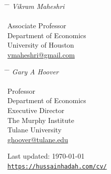 \documentclass[letterpaper]{article}
\begin{document}
\vspace{0.7cm}

\noindent
\parbox[t]{0.32\textwidth}{
\begin{tabbing}
\hspace{2.75cm} \= \hspace{4cm} \= \kill
{\textit{Vikram Maheshri} } \\\\
Associate Professor \\
Department of Economics \\
{University of Houston}\\
{\href{mailto:vmaheshri@gmail.com}{vmaheshri@gmail.com}}
\end{tabbing}}
\hfill
\parbox[t]{0.32\textwidth}{
\begin{tabbing}
\hspace{2.75cm} \= \hspace{4cm} \= \kill
{\textit{Gary A Hoover} } \\\\
Professor  \\
Department of Economics \\
Executive Director \\
The Murphy Institute \\
{Tulane University}\\
{\href{mailto:ghoover@tulane.edu}{ghoover@tulane.edu}}
\end{tabbing}}

\enlargethispage{-10mm}  %
\begin{center}
  \begin{footnotesize}
    Last updated: \today \\
    \href{https://hussainhadah.com/cv/}{\texttt{https://hussainhadah.com/cv/}}
  \end{footnotesize}
\end{center}
\end{document}
